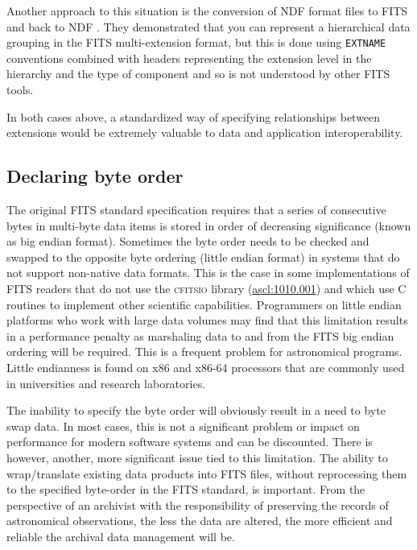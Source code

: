 \documentclass[final,authoryear,5p,times,twocolumn]{elsarticle}
\begin{document}
{{Another approach to this situation is the conversion of NDF
format files to FITS and back to NDF \citep{SUN55,1997STARB..19...14C}.
They demonstrated that you can represent a hierarchical data grouping
in the FITS multi-extension format, but this is done using \texttt{EXTNAME}
conventions combined with headers representing the extension level in
the hierarchy and the type of component and so is not understood by
other FITS tools.

In both cases above, a standardized way of specifying relationships
between extensions would be extremely valuable to data and application interoperability.


\subsection{Declaring byte order}
\label{section_byte_order}

The original FITS standard specification \citep{1981A&AS...44..363W}
requires that a series of consecutive bytes in multi-byte data items is
stored in order of decreasing significance (known as big endian format).
Sometimes the byte order needs to be checked and swapped to the opposite
byte ordering (little endian format) in systems that do not support
non-native data formats.  This is the case in some implementations of FITS
readers that do not use the \textsc{cfitsio} library
(\href{http://ascl.net/1010.001}{ascl:1010.001}) and which use C routines
to implement other scientific capabilities.  Programmers on little endian
platforms who work with large data volumes may find that this limitation
results in a performance penalty as marshaling data to and from
the FITS big endian ordering will be required.  This is a frequent problem
for astronomical programs. Little endianness is found on x86 and x86-64
processors that are commonly used in universities and research
laboratories.


The inability to specify the byte order will obviously result in a
need to byte swap data. In most cases, this is not a significant
problem or impact on performance for modern software systems and
can be discounted. There is however, another, more significant issue
tied to this limitation. The ability to wrap/translate existing data products
into FITS files, without reprocessing them to the specified
byte-order in the FITS standard, is important. From
the perspective of an archivist with the responsibility of preserving the
records of astronomical observations, the less the data are altered, the
more efficient and reliable the archival data management will be.


}}
\end{document}
